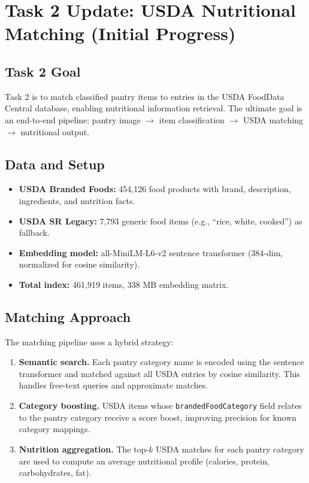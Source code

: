 \section{Task 2 Update: USDA Nutritional Matching (Initial Progress)}

\subsection{Task 2 Goal}

Task 2 is to match classified pantry items to entries in the USDA FoodData Central database, enabling nutritional information retrieval. The ultimate goal is an end-to-end pipeline: pantry image $\rightarrow$ item classification $\rightarrow$ USDA matching $\rightarrow$ nutritional output.

\subsection{Data and Setup}

\begin{itemize}[nosep,leftmargin=1.5em]
 \item \textbf{USDA Branded Foods:} 454,126 food products with brand, description, ingredients, and nutrition facts.
 \item \textbf{USDA SR Legacy:} 7,793 generic food items (e.g., ``rice, white, cooked'') as fallback.
 \item \textbf{Embedding model:} all-MiniLM-L6-v2 sentence transformer (384-dim, normalized for cosine similarity).
 \item \textbf{Total index:} 461,919 items, 338 MB embedding matrix.
\end{itemize}

\subsection{Matching Approach}

The matching pipeline uses a hybrid strategy:

\begin{enumerate}[nosep,leftmargin=1.5em]
 \item \textbf{Semantic search.} Each pantry category name is encoded using the sentence transformer and matched against all USDA entries by cosine similarity. This handles free-text queries and approximate matches.
 \item \textbf{Category boosting.} USDA items whose \texttt{brandedFoodCategory} field relates to the pantry category receive a score boost, improving precision for known category mappings.
 \item \textbf{Nutrition aggregation.} The top-$k$ USDA matches for each pantry category are used to compute an average nutritional profile (calories, protein, carbohydrates, fat).
\end{enumerate}

